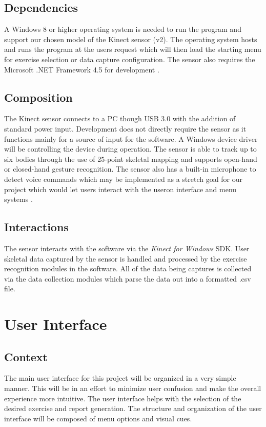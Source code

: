 \documentclass[onecolumn, draftclsnofoot,10pt, compsoc]{IEEEtran}
\begin{document}
\subsection{Dependencies}
A Windows 8 or higher operating system is needed to run the program and support our chosen model of the Kinect sensor (v2). The operating system hosts and runs the program at the users request which will then load the starting menu for exercise selection or data capture configuration. The sensor also requires the Microsoft .NET Framework 4.5 for development \cite{KinectDevelop}. 

\subsection{Composition}
The Kinect sensor connects to a PC though USB 3.0 with the addition of standard power input. Development does not directly require the sensor as it functions mainly for a source of input for the software. A Windows device driver will be controlling the device during operation. The sensor is able to track up to six bodies through the use of 25-point skeletal mapping and supports open-hand or closed-hand gesture recognition. The sensor also has a built-in microphone to detect voice commands which may be implemented as a stretch goal for our project which would let users interact with the useron interface and menu systems \cite{KinectConstraints}. 

\subsection{Interactions}
The sensor interacts with the software via the \textit{Kinect for Windows} SDK. User skeletal data captured by the sensor is handled and processed by the exercise recognition modules in the software. All of the data being captures is collected via the data collection modules which parse the data out into a formatted .csv file. 

\section{User Interface}
\subsection{Context}
The main user interface for this project will be organized in a very simple manner. This will be in an effort to minimize user confusion and make the overall experience more intuitive. The user interface helps with the selection of the desired exercise and report generation. The structure and organization of the user interface will be composed of menu options and visual cues. 
\end{document}
